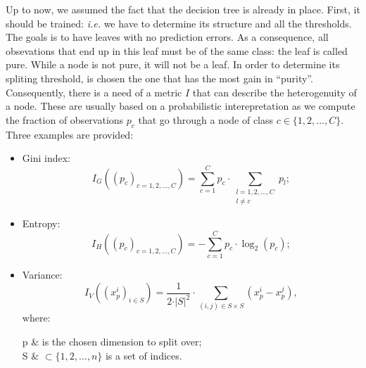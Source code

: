                 Up to now, we assumed the fact that the decision tree is already in place.
                First, it should be trained: \textit{i.e.} we have to determine its structure and all the thresholds.
                The goals is to have leaves with no prediction errors.
                As a consequence, all obsevations that end up in this leaf must be of the same class: the leaf is called pure.
                While a node is not pure, it will not be a leaf.
                In order to determine its spliting threshold, is chosen the one that has the most gain in ``purity''.
                Consequently, there is a need of a metric $I$ that can describe the heterogenuity of a node.
                These are usually based on a probabilistic interepretation as we compute the fraction of observations $p_c$ that go through a node of class $c \in \{1, 2, \dots, C\}$.
                Three examples are provided:
                \begin{itemize}
                    \item Gini index:
                    \begin{equation}
                        \label{eq::gini}
                        I_G\left(\left(p_c\right)_{c=1, 2, \dots, C}\right) = \sum_{c=1}^{C} p_c \cdot \sum_{\substack{l=1, 2, \dots, C\\l \neq c}} p_l;
                    \end{equation}
                    \item Entropy:
                    \begin{equation}
                        \label{eq::entropy}
                        I_H\left(\left(p_c\right)_{c=1, 2, \dots, C}\right) = - \sum_{c=1}^{C} p_c \cdot \log_2(p_c);
                    \end{equation}
                    \item Variance:
                    \begin{equation}
                        \label{eq::variance_index}
                        I_V\left(\left(x_p^i\right)_{i\in S}\right) = \frac{1}{2 \cdot \vert S \vert^2} \cdot \sum_{(i,j) \in S\times S} \left(x_p^i - x_p^j\right),
                    \end{equation}
                    where:
                    \begin{conditions}
                        p & is the chosen dimension to split over;\\
                        S & $\subset \{1, 2, \dots, n\}$ is a set of indices.
                    \end{conditions}
                \end{itemize}
